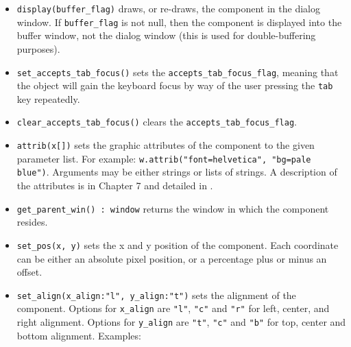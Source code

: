 \begin{itemize}
\item\noindent\texttt{display(buffer\_flag)} draws, or re-draws, the component in the dialog
window. If \texttt{buffer\_flag} is not null, then the component is displayed
into the buffer window, not the dialog window (this is used for
double-buffering purposes).

\item\noindent\texttt{set\_accepts\_tab\_focus()} sets the
\texttt{accepts\_tab\_focus\_flag}, meaning
that the object will gain the keyboard focus by way of the user
pressing the \texttt{tab} key repeatedly.

\item\noindent\texttt{clear\_accepts\_tab\_focus()} clears the \texttt{accepts\_tab\_focus\_flag}.

\item\noindent\texttt{attrib(x[])} sets the graphic attributes of the component to the given
parameter list. For example:
\texttt{w.attrib("font=helvetica", "bg=pale blue")}. Arguments may be either
strings or lists of strings. A description of the attributes is in
Chapter 7 and detailed in \cite{GJT98}.

\item\noindent\texttt{get\_parent\_win() : window} returns the window in which
the component resides.

\item\noindent\texttt{set\_pos(x, y)} sets the x and y position of the component. Each
coordinate can be either an absolute pixel position, or a
percentage plus or minus an offset.


\item\noindent\texttt{set\_align(x\_align:"l", y\_align:"t")} sets the alignment of the
component. Options for \texttt{x\_align} are \texttt{"l"}, \texttt{"c"} and \texttt{"r"}
for left, center, and right alignment. Options for \texttt{y\_align} are
\texttt{"t"}, \texttt{"c"} and \texttt{"b"} for top, center and bottom alignment.
Examples:



\end{itemize}
